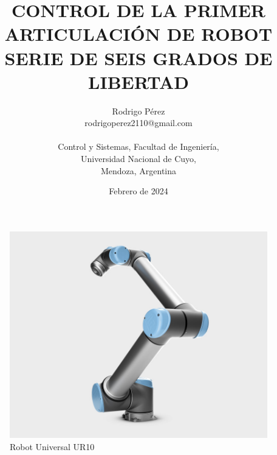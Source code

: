 \documentclass{article}
\title{\textbf{CONTROL DE LA PRIMER ARTICULACIÓN DE ROBOT SERIE DE SEIS GRADOS DE LIBERTAD}}
\author{Rodrigo Pérez \\ rodrigoperez2110@gmail.com \\ \\ Control y Sistemas, Facultad de Ingeniería, \\ Universidad Nacional de Cuyo, \\ Mendoza, Argentina}
\date{Febrero de 2024}
\begin{document}
\renewcommand{\tablename}{Tabla}

\maketitle


\begin{figure}[H]
    \centering
    \includegraphics[width=1\textwidth]{UR10-UNIVERSAL-ROBOT}
    \caption{Robot Universal UR10}
    \label{fig:UR10-UNIVERSAL-ROBOT}
\end{figure}
\end{document}

